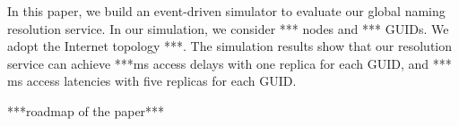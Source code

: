     In this paper, we build an event-driven simulator to evaluate our global naming resolution service. In our simulation, we consider *** nodes and *** GUIDs. We adopt the Internet topology ***. The simulation results show that our resolution service can achieve ***ms access delays with one replica for each GUID, and *** ms access latencies with five replicas for each GUID.

    ***roadmap of the paper***



%
%
%
%
%
%
%
%
%
%
%
%
%
%
%
%
%
%
%
%
%
%
%

